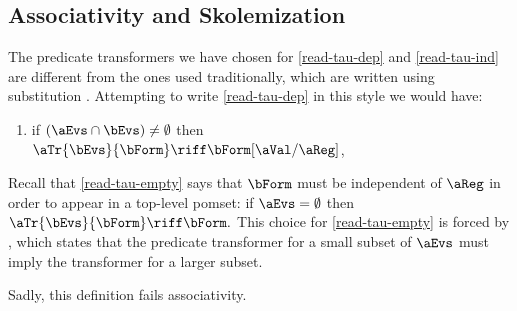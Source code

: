 \subsection{Associativity and Skolemization}
\label{sec:ex:assoc}

The predicate transformers we have chosen for \ref{read-tau-dep} and
\ref{read-tau-ind} are different from the ones used traditionally, which are
written using substitution \jjr{}.  Attempting to write \ref{read-tau-dep} in
this style we would have:
\begin{enumerate}[topsep=0pt]
\item[{\labeltext[\textsc{r}4a$'$]{(\textsc{r}4a$'$)}{read-tau-dep-p}}]
  if $(\aEvs\cap\bEvs)\neq\emptyset$ then
  \begin{math}
    \aTr{\bEvs}{\bForm} \riff    
    \bForm[\aVal/\aReg]
  \end{math},    
\end{enumerate}
Recall that \ref{read-tau-empty} says that $\bForm$ must be independent of
$\aReg$ in order to appear in a top-level pomset: if $\aEvs=\emptyset$ then
\begin{math}
  \aTr{\bEvs}{\bForm} \riff
  \bForm.
\end{math}
This choice for \ref{read-tau-empty} is forced by , which
states that the predicate transformer for a small subset of $\aEvs$ must
imply the transformer for a larger subset.

Sadly, this definition fails associativity.

